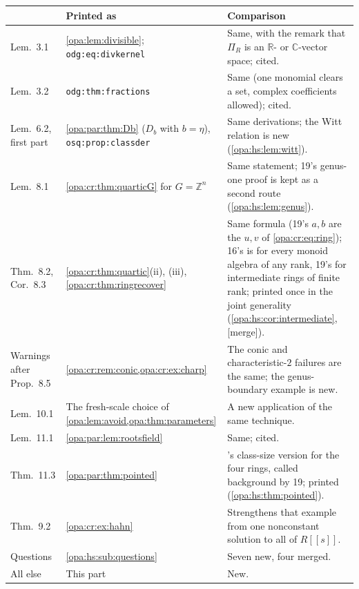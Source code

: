 \documentclass[11pt,oneside]{article}
\numberwithin{equation}{section}
\theoremstyle{definition}
\theoremstyle{remark}
\newcommand{\R}{\mathbb R}
\newcommand{\C}{\mathbb C}
\newcommand{\Z}{\mathbb Z}
\newcommand{\mergetag}{\textup{\textsf{\small[merge]}}}
\newcommand{\lbl}[1]{\nolinkurl{#1}}
\begin{document}
\begin{center}
\renewcommand{\arraystretch}{1.15}
\begin{longtable}{>{\raggedright\arraybackslash}p{}>{\raggedright\arraybackslash}p{}>{\raggedright\arraybackslash}p{}}
\toprule
19 & Printed as & Comparison\\
\midrule
\endhead
Lem.~3.1 & \cref{opa:lem:divisible}; \lbl{odg:eq:divkernel} & Same, with the remark that $\Pi_R$ is an $\R$- or $\C$-vector space; cited.\\
Lem.~3.2 & \lbl{odg:thm:fractions} & Same (one monomial clears a set, complex coefficients allowed); cited.\\
Lem.~6.2, first part & \cref{opa:par:thm:Db} ($D_b$ with $b=\eta$), \lbl{osq:prop:classder} & Same derivations; the Witt relation
is new (\cref{opa:hs:lem:witt}).\\
Lem.~8.1 & \cref{opa:cr:thm:quarticG} for $G=\Z^n$ & Same statement; 19's genus-one proof is kept as a second route
(\cref{opa:hs:lem:genus}).\\
Thm.~8.2, Cor.~8.3 & \cref{opa:cr:thm:quartic}(ii), (iii), \cref{opa:cr:thm:ringrecover} & Same formula (19's $a,b$ are the $u,v$ of
\eqref{opa:cr:eq:ring}); 16's is for every monoid algebra of any rank, 19's for intermediate rings of finite rank; printed once
in the joint generality (\cref{opa:hs:cor:intermediate}, \mergetag).\\
Warnings after Prop.~8.5 & \cref{opa:cr:rem:conic,opa:cr:ex:charp} & The conic and characteristic-$2$ failures are the same; the
genus-boundary example is new.\\
Lem.~10.1 & The fresh-scale choice of \cref{opa:lem:avoid,opa:thm:parameters} & A new application of the same technique.\\
Lem.~11.1 & \cref{opa:par:lem:rootsfield} & Same; cited.\\
Thm.~11.3 & \cref{opa:par:thm:pointed} & 19's class-size version for the four rings, called background by 19; printed
(\cref{opa:hs:thm:pointed}).\\
Thm.~9.2 & \cref{opa:cr:ex:hahn} & Strengthens that example from one nonconstant solution to all of $R[[s]]$.\\
Questions & \cref{opa:hs:sub:questions} & Seven new, four merged.\\
All else & This part & New.\\
\bottomrule
\end{longtable}
\end{center}
\end{document}
